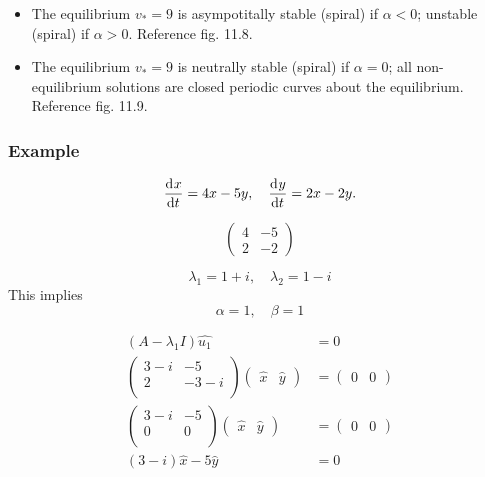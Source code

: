\documentclass[12pt,twoside]{article}
\begin{document}
\begin{itemize}
\item The equilibrium $v_*=9$ is asympotitally stable (spiral) if $\alpha<0$;
  unstable (spiral) if $\alpha>0$. Reference fig. 11.8.
\item The equilibrium $v_*=9$ is neutrally stable (spiral) if $\alpha=0$; all
  non-equilibrium solutions are closed periodic curves about the equilibrium.
  Reference fig. 11.9.
\end{itemize}

\subsubsection{Example}
\begin{equation}
  \frac{\mathrm{d}^{} {x}}{\mathrm{d}{t}^{}} = 4x-5y,\quad \frac{\mathrm{d}^{} {y}}{\mathrm{d}{t}^{}}=2x-2y.
\end{equation}

\begin{equation}
  \begin{pmatrix}
    4 & -5 \\ 2 & -2
  \end{pmatrix}
\end{equation}

\begin{equation}
  \lambda_1=1+i,\quad \lambda_2=1-i
\end{equation}
This implies
\begin{equation}
  \alpha=1,\quad \beta=1
\end{equation}

\begin{equation}
  \begin{aligned}
    (A-\lambda_1I)\hat{u_1} &= 0 \\
    \begin{pmatrix}
      3-i & -5 \\ 2 & -3-i \\
    \end{pmatrix}
    \begin{pmatrix}
      \hat{x} & \hat{y}
    \end{pmatrix} &=
    \begin{pmatrix}
      0 & 0
    \end{pmatrix} \\
    \begin{pmatrix}
      3-i & -5 \\ 0 & 0 \\
    \end{pmatrix}
    \begin{pmatrix}
      \hat{x} & \hat{y}
    \end{pmatrix} &=
    \begin{pmatrix}
      0 & 0
    \end{pmatrix} \\
    (3-i)\hat{x}-5\hat{y}&=0 \\
  \end{aligned}
\end{equation}
\end{document}
